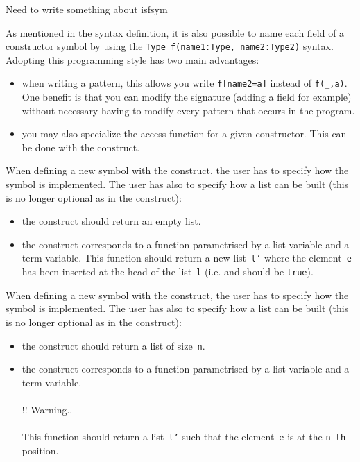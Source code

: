 \label{isfsym} Need to write something about isfsym

\noindent
As mentioned in the syntax definition, it is also possible to name
each field of a constructor symbol by using the
\texttt{Type f(name1:Type, name2:Type2)} syntax.  
Adopting this programming style has two main advantages:
\begin{itemize}
\item when writing a pattern, this allows you write \texttt{f[name2=a]}
  instead of \texttt{f(\_,a)}. One benefit is that you can modify the
  signature (adding a field for example) without necessary having to
  modify every pattern that occurs in the program.

\item\label{getslot} you may also specialize the  access
function for a given constructor. This can be done with the
 construct.
\end{itemize}

\smallskip\noindent\label{oplistdef}
When defining a new symbol with the  construct,
the user has to specify how the symbol is implemented. 
The user has also to specify how a list can be built (this is no
longer optional as in the  construct):
\begin{itemize}
\item\label{emptylist} the  construct should return an empty
  list.

\item\label{insert} the  construct corresponds to a function
  parametrised by a list variable and a term variable. This function
  should return a new list~\texttt{l'} where the element~\texttt{e}
  has been inserted at the head of the list~\texttt{l}
  (i.e.  and
   should be \texttt{true}).
\end{itemize}

\noindent\label{oparraydef}
When defining a new symbol with the  construct,
the user has to specify how the symbol is implemented. 
The user has also to specify how a list can be built (this is no 
longer optional as in the  construct):
\begin{itemize}
\item\label{emptyarray} the  construct should return a list of
  size~\texttt{n}.  

\item\label{append} the  construct corresponds to a
  function parametrised by a list variable and a term variable. 
\\\\!! Warning..\\\\
This function should return a list~\texttt{l'} such that
  the element~\texttt{e} is at the \texttt{n-th} position.
\end{itemize}

